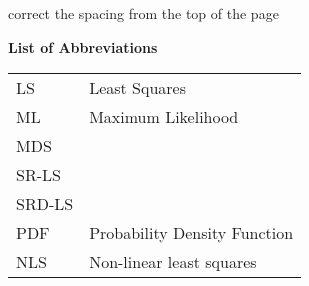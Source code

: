 \newpage
{}

\phantom{m}

correct the spacing from the top of the page

\begin{flushleft}
\begin{Huge}
\textbf{List of Abbreviations}
\end{Huge}
\end{flushleft}

\begin{table}[h]
\begin{tabular}{l l} 
LS & Least Squares \\
ML & Maximum Likelihood \\
MDS &  \\
SR-LS  & \\
SRD-LS & \\
PDF & Probability Density Function \\
NLS & Non-linear least squares \\
\end{tabular}
\end{table}
